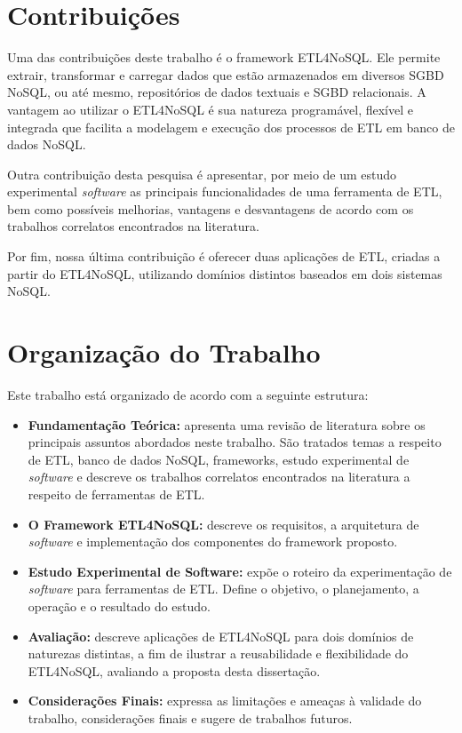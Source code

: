 \section{Contribuições}

Uma das contribuições deste trabalho é o framework ETL4NoSQL. Ele permite extrair, transformar e carregar dados que estão armazenados em diversos SGBD NoSQL, ou até mesmo, repositórios de dados textuais e SGBD relacionais. A vantagem ao utilizar o ETL4NoSQL é sua natureza programável, flexível e integrada que facilita a modelagem e execução dos processos de ETL em banco de dados NoSQL.

Outra contribuição desta pesquisa é apresentar, por meio de um estudo experimental \textit{software} as principais funcionalidades de uma ferramenta de ETL, bem como possíveis melhorias, vantagens e desvantagens de acordo com os trabalhos correlatos encontrados na literatura.

Por fim, nossa última contribuição é oferecer duas aplicações de ETL, criadas a partir do ETL4NoSQL, utilizando domínios distintos baseados em dois sistemas NoSQL. 

\section{Organização do Trabalho}

Este trabalho está organizado de acordo com a seguinte estrutura:

\begin{itemize}
	\item \textbf{Fundamentação Teórica:} apresenta uma revisão de literatura sobre os principais assuntos abordados neste trabalho. São tratados temas a respeito de ETL, banco de dados NoSQL, frameworks, estudo experimental de \textit{software} e descreve os trabalhos correlatos encontrados na literatura a respeito de ferramentas de ETL.
	
	\item \textbf{O Framework ETL4NoSQL:} descreve os requisitos, a arquitetura de \textit{software} e implementação dos componentes do framework proposto.
			
	\item \textbf{Estudo Experimental de Software:} expõe o roteiro da experimentação de \textit{software} para ferramentas de ETL. Define o objetivo, o planejamento, a operação e o resultado do estudo.
	
	\item \textbf{Avaliação:} descreve aplicações de ETL4NoSQL para dois domínios de naturezas distintas, a fim de ilustrar a reusabilidade e flexibilidade do ETL4NoSQL, avaliando a proposta desta dissertação.
		
	\item \textbf{Considerações Finais:} expressa as limitações e ameaças à validade do trabalho, considerações finais e sugere de trabalhos futuros.	
	
\end{itemize}

